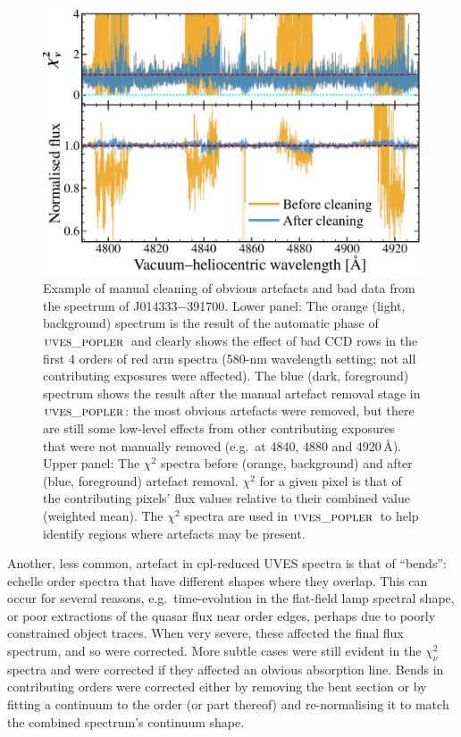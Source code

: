 \documentclass[fleqn,usenatbib,usedcolumn]{mnras}
\newcommand{\popler}{\ensuremath{\textsc{uves\_popler}}}
\begin{document}
\begin{figure}
\begin{center}
\includegraphics[width=0.90\columnwidth]{DR1_J014333-391700_baddata.pdf}
\vspace{-1em}
\caption{Example of manual cleaning of obvious artefacts and bad data from the spectrum of J014333$-$391700. Lower panel: The orange (light, background) spectrum is the result of the automatic phase of \popler\ and clearly shows the effect of bad CCD rows in the first 4 orders of red arm spectra (580-nm wavelength setting; not all contributing exposures were affected). The blue (dark, foreground) spectrum shows the result after the manual artefact removal stage in \popler: the most obvious artefacts were removed, but there are still some low-level effects from other contributing exposures that were not manually removed (e.g.\ at 4840, 4880 and 4920\,\AA). Upper panel: The $\chi^2$ spectra before (orange, background) and after (blue, foreground) artefact removal. $\chi^2$ for a given pixel is that of the contributing pixels' flux values relative to their combined value (weighted mean). The $\chi^2$ spectra are used in \popler\ to help identify regions where artefacts may be present.}
\label{f:baddata}
\end{center}
\end{figure}

Another, less common, artefact in {\sc cpl}-reduced UVES spectra is that of ``bends'': echelle order spectra that have different shapes where they overlap. This can occur for several reasons, e.g.\ time-evolution in the flat-field lamp spectral shape, or poor extractions of the quasar flux near order edges, perhaps due to poorly constrained object traces. When very severe, these affected the final flux spectrum, and so were corrected. More subtle cases were still evident in the $\chi_\nu^2$ spectra and were corrected if they affected an obvious absorption line. Bends in contributing orders were corrected either by removing the bent section or by fitting a continuum to the order (or part thereof) and re-normalising it to match the combined spectrum's continuum shape.
\end{document}
